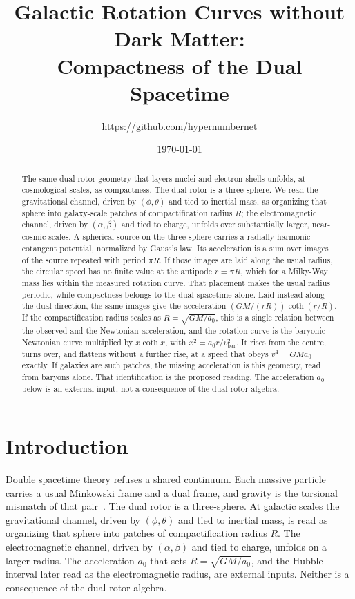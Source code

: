 \documentclass[a4paper]{article}
\title{Galactic Rotation Curves without Dark Matter:\\
Compactness of the Dual Spacetime}
\author{https://github.com/hypernumbernet}
\date{\today}
\begin{document}
\maketitle

\begin{abstract}
The same dual-rotor geometry that layers nuclei and electron shells unfolds, at cosmological scales, as compactness. The dual rotor is a three-sphere. We read the gravitational channel, driven by $(\phi,\theta)$ and tied to inertial mass, as organizing that sphere into galaxy-scale patches of compactification radius $R$; the electromagnetic channel, driven by $(\alpha,\beta)$ and tied to charge, unfolds over substantially larger, near-cosmic scales. A spherical source on the three-sphere carries a radially harmonic cotangent potential, normalized by Gauss's law. Its acceleration is a sum over images of the source repeated with period $\pi R$. If those images are laid along the usual radius, the circular speed has no finite value at the antipode $r=\pi R$, which for a Milky-Way mass lies within the measured rotation curve. That placement makes the usual radius periodic, while compactness belongs to the dual spacetime alone. Laid instead along the dual direction, the same images give the acceleration $(GM/(rR))\coth(r/R)$. If the compactification radius scales as $R=\sqrt{GM/a_0}$, this is a single relation between the observed and the Newtonian acceleration, and the rotation curve is the baryonic Newtonian curve multiplied by $x\coth x$, with $x^2=a_0r/v_{\text{bar}}^2$. It rises from the centre, turns over, and flattens without a further rise, at a speed that obeys $v^4=GMa_0$ exactly. If galaxies are such patches, the missing acceleration is this geometry, read from baryons alone. That identification is the proposed reading. The acceleration $a_0$ below is an external input, not a consequence of the dual-rotor algebra.
\end{abstract}

\section{Introduction}
\label{sec:introduction}

Double spacetime theory refuses a shared continuum. Each massive particle carries a usual Minkowski frame and a dual frame, and gravity is the torsional mismatch of that pair~\cite{dst-main}. The dual rotor is a three-sphere. At galactic scales the gravitational channel, driven by $(\phi,\theta)$ and tied to inertial mass, is read as organizing that sphere into patches of compactification radius $R$. The electromagnetic channel, driven by $(\alpha,\beta)$ and tied to charge, unfolds on a larger radius. The acceleration $a_0$ that sets $R=\sqrt{GM/a_0}$, and the Hubble interval later read as the electromagnetic radius, are external inputs. Neither is a consequence of the dual-rotor algebra.
\end{document}
